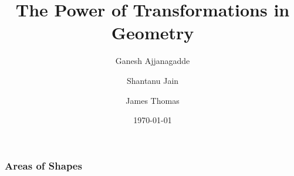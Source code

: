 \documentclass{beamer}
\title{The Power of Transformations in Geometry}
\author{Ganesh Ajjanagadde \and Shantanu Jain \and James Thomas}
\date{\today}
\begin{document}
\maketitle

\begin{frame}
\frametitle{Areas of Shapes}

\end{frame}
\end{document}
